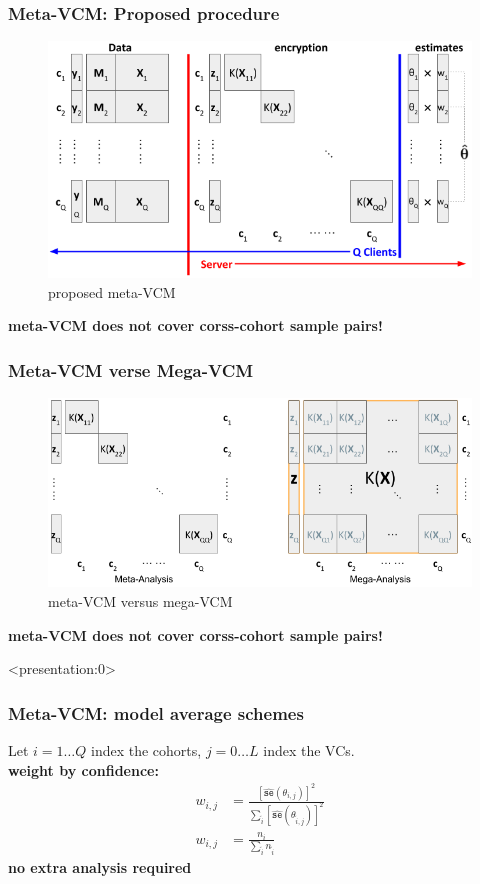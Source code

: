\documentclass{beamer}
\newcommand{\se}[1]{\hat{\mathtt{se}}\left(#1\right)} %
\newcommand{\ti}{{\tilde{i}}}                         %
\begin{document}
\begin{frame}\frametitle{Meta-VCM: Proposed procedure}
  \begin{figure}
    \centering \includegraphics[width=\textwidth]{img/meta1}
    \caption{proposed meta-VCM}
    \label{fig:mata1}
  \end{figure}
  \textbf{meta-VCM does not cover corss-cohort sample pairs!}
\end{frame}
\begin{frame}\frametitle{Meta-VCM verse Mega-VCM}
  \begin{figure}
    \centering \includegraphics[width=\textwidth]{img/meta-mega}
    \caption{meta-VCM versus mega-VCM}
    \label{fig:info_comp}
  \end{figure}
  \textbf{meta-VCM does not cover corss-cohort sample pairs!}
\end{frame}
\begin{frame}<presentation:0> %
  \frametitle{Meta-VCM: model average schemes} %
  Let $i = 1 \dots Q$ index the cohorts, $j = 0 \dots L$ index the VCs.\\
  \textbf{weight by confidence:}
  \begin{align}
    w_{i,j} &= \frac{\left[\se{\theta_{i,j}} \right ]^2}
              {\sum_\ti \left[\se{\theta_{\ti,j}} \right ]^2} \\
    w_{i,j} &= \frac{n_i}{\sum_\ti n_\ti}
  \end{align}
  {\color{blue}\textbf{no extra analysis required}}
\end{frame}
\end{document}

